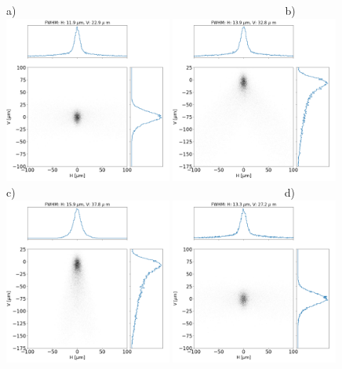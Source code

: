 \documentclass{iucr}              %
\begin{document}
\begin{figure}\label{fig:finalcomparison}
\flushleft
a)~~~~~~~~~~~~~~~~~~~~~~~~~~~~~~~~~~~~~~~~~~~~~~~~~b)\\
\centering
\includegraphics[width=0.49\textwidth]{figures/prefinal_approx1.png} 
\includegraphics[width=0.49\textwidth]{figures/prefinal_approx1_linearized.png}\\

\flushleft
c)~~~~~~~~~~~~~~~~~~~~~~~~~~~~~~~~~~~~~~~~~~~~~~~~~d)\\
\centering
\includegraphics[width=0.49\textwidth]{figures/prefinal_approx2.png} 
\includegraphics[width=0.49\textwidth]{figures/prefinal_approx1_exact1over2.png} 



\end{figure}
\end{document}
